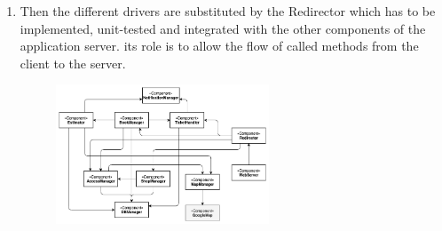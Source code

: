 \begin{enumerate}
\item Then the different drivers are substituted by the Redirector which has to be implemented, unit-tested and integrated with the other components of the application server. its role is to allow the flow of called methods from the client to the server.\\
\begin{figure}[H]
  \centering
  \includegraphics[width=0.6\textwidth,keepaspectratio]{images/IS/IS7.png}
\end{figure}
\end{enumerate}
